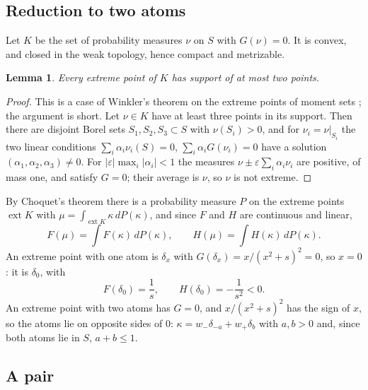 \documentclass[11pt]{amsart}
\newtheorem{lemma}[theorem]{Lemma}
\theoremstyle{definition}
\DeclareMathOperator{\ext}{ext}
\begin{document}
\subsection{Reduction to two atoms}

Let $K$ be the set of probability measures $\nu$ on $S$ with $G(\nu)=0$. It is convex, and closed in the weak topology, hence compact and metrizable.

\begin{lemma}\label{lem:extreme}
Every extreme point of $K$ has support of at most two points.
\end{lemma}

\begin{proof}
This is a case of Winkler's theorem on the extreme points of moment sets \cite{Winkler}; the argument is short. Let $\nu\in K$ have at least three points in its support. Then there are disjoint Borel sets $S_1,S_2,S_3\subset S$ with $\nu(S_i)>0$, and for $\nu_i=\nu|_{S_i}$ the two linear conditions $\sum_i\alpha_i\nu_i(S)=0$, $\sum_i\alpha_iG(\nu_i)=0$ have a solution $(\alpha_1,\alpha_2,\alpha_3)\ne0$. For $|\varepsilon|\max_i|\alpha_i|<1$ the measures $\nu\pm\varepsilon\sum_i\alpha_i\nu_i$ are positive, of mass one, and satisfy $G=0$; their average is $\nu$, so $\nu$ is not extreme.
\end{proof}

By Choquet's theorem \cite{Phelps} there is a probability measure $P$ on the extreme points $\ext K$ with $\mu=\int_{\ext K}\kappa\,dP(\kappa)$, and since $F$ and $H$ are continuous and linear,
\begin{equation}\label{eq:choquet}
F(\mu)=\int F(\kappa)\,dP(\kappa),\qquad H(\mu)=\int H(\kappa)\,dP(\kappa).
\end{equation}
An extreme point with one atom is $\delta_x$ with $G(\delta_x)=x/(x^2+s)^2=0$, so $x=0$: it is $\delta_0$, with
\begin{equation}\label{eq:delta0}
F(\delta_0)=\frac1s,\qquad H(\delta_0)=-\frac1{s^2}<0.
\end{equation}
An extreme point with two atoms has $G=0$, and $x/(x^2+s)^2$ has the sign of $x$, so the atoms lie on opposite sides of $0$: $\kappa=w_-\delta_{-a}+w_+\delta_b$ with $a,b>0$ and, since both atoms lie in $S$, $a+b\le1$.

\subsection{A pair}
\end{document}
